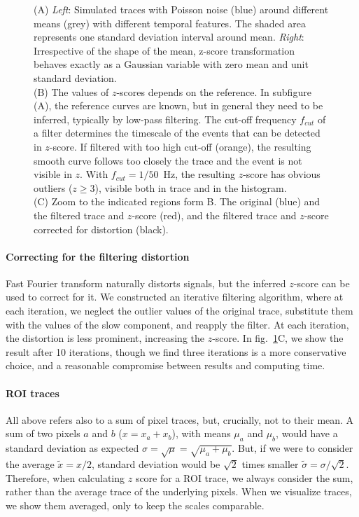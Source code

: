 \documentclass[a4paper,11pt,oneside,]{article}
\begin{document}
\begin{figure}[t]
\begin{minipage}{.49\textwidth}
    \end{minipage}
    \caption{
    (A) \emph{Left}: Simulated traces with Poisson noise (blue) around different means (grey) with different temporal features. The shaded area represents one standard deviation interval around mean. 
    \emph{Right}: Irrespective of the shape of the mean, z-score transformation behaves exactly as a Gaussian variable with zero mean and unit standard deviation.\\
    (B) The values of $z$-scores depends on the reference. In subfigure (A), the reference curves are known, but in general they need to be inferred, typically by low-pass filtering. The cut-off frequency $f_{cut}$ of a filter determines the timescale of the events that can be detected in $z$-score. If filtered with too high cut-off (orange), the resulting smooth curve follows too closely the trace and the event is not visible in $z$. With $f_{cut}=1/50$~Hz, the resulting $z$-score has obvious outliers ($z\geq 3$), visible both in trace and in the histogram.\\
    (C) Zoom to the indicated regions form B. The original (blue) and the filtered trace and $z$-score (red), and the filtered trace and $z$-score corrected for distortion (black).
    \label{fig:z_score}
    }
\end{figure}


\paragraph{Correcting for the filtering distortion} 
Fast Fourier transform naturally distorts signals, but the inferred $z$-score can be used to correct for it. We constructed an iterative filtering algorithm, where at each iteration, we neglect the outlier values of the original trace, substitute them with the values of the slow component, and reapply the filter. At each iteration, the distortion is less prominent, increasing the $z$-score.
In fig.~\ref{fig:z_score}C, we show the result after 10 iterations, though we find three iterations is a more conservative choice, and a reasonable compromise between results and computing time.


\paragraph{ROI traces}
All above refers also to a sum of pixel traces, but, crucially, not to their mean. A sum of two pixels $a$ and $b$ ($x=x_a+x_b$), with means $\mu_a$ and $\mu_b$, would have a standard deviation as expected $\sigma = \sqrt{\mu} = \sqrt{\mu_a+\mu_b}$. But, if we were to consider the average $\tilde x = x/2$, standard deviation would be $\sqrt{2}$ times smaller $\tilde \sigma = \sigma/\sqrt{2}$.
Therefore, when calculating $z$ score for a ROI trace, we always consider the sum, rather than the average trace of the underlying pixels. When we visualize traces, we show them averaged, only to keep the scales comparable.
\end{document}
